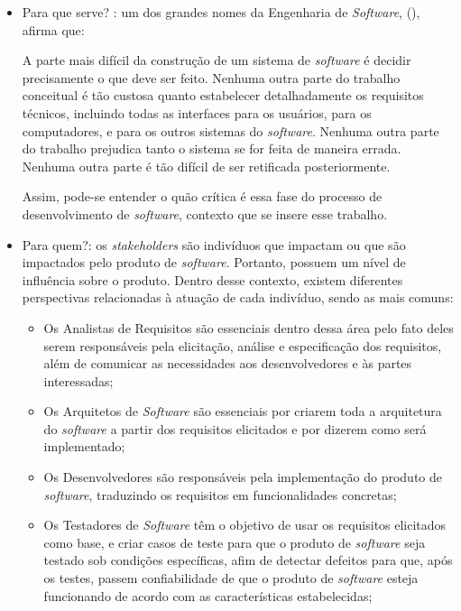 \begin{itemize}
    \item Para que serve? : um dos grandes nomes da Engenharia de \textit{Software}, (\citeyear{brooks1995mythical}), afirma que:
        \begin{citacao}
            A parte mais difícil da construção de um sistema de \textit{software} é decidir precisamente o que deve ser feito. Nenhuma outra parte do trabalho conceitual é tão custosa quanto estabelecer detalhadamente os requisitos técnicos, incluindo todas as interfaces para os usuários, para os computadores, e para os outros sistemas do \textit{software}. Nenhuma outra parte do trabalho prejudica tanto o sistema se for feita de maneira errada. Nenhuma outra parte é tão difícil de ser retificada posteriormente.
        \end{citacao}
    Assim, pode-se entender o quão crítica é essa fase do processo de desenvolvimento de \textit{software}, contexto que se insere esse trabalho.
    
    \item Para quem?: os \textit{stakeholders} são indivíduos que impactam ou que são impactados pelo produto de \textit{software}. Portanto, possuem um nível de influência sobre o produto. Dentro desse contexto, existem diferentes perspectivas relacionadas à atuação de cada indivíduo, sendo as mais comuns:
    
    \begin{itemize}
        \item Os Analistas de Requisitos são essenciais dentro dessa área pelo fato deles serem responsáveis pela elicitação, análise e especificação dos requisitos, além de comunicar as necessidades aos desenvolvedores e às partes interessadas;
    
        \item Os Arquitetos de \textit{Software} são essenciais por criarem toda a arquitetura do \textit{software} a partir dos requisitos elicitados e por dizerem como será implementado;
    
        \item Os Desenvolvedores são responsáveis pela implementação do produto de \textit{software}, traduzindo os requisitos em funcionalidades concretas;
    
        \item Os Testadores de \textit{Software} têm o objetivo de usar os requisitos elicitados como base, e criar casos de teste para que o produto de \textit{software} seja testado sob condições específicas, afim de detectar defeitos para que, após os testes, passem confiabilidade de que o produto de \textit{software} esteja funcionando de acordo com as características estabelecidas;
    

\end{itemize}
\end{itemize}
